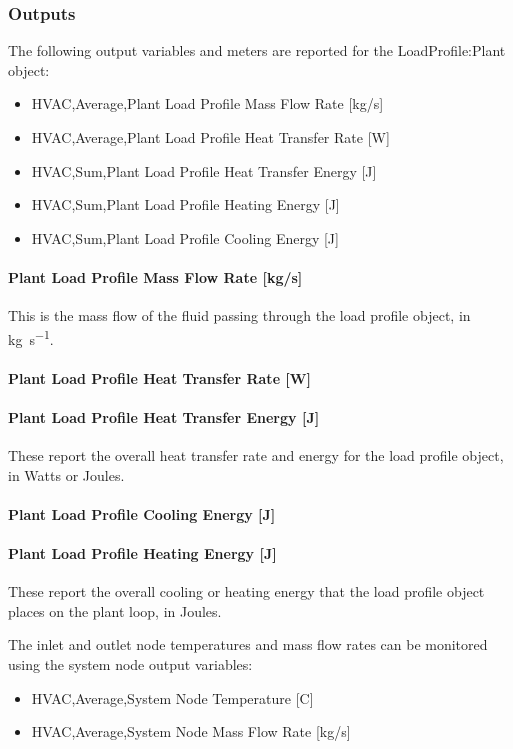 \subsubsection{Outputs}\label{outputs-020}

The following output variables and meters are reported for the LoadProfile:Plant object:

\begin{itemize}
\item HVAC,Average,Plant Load Profile Mass Flow Rate [kg/s]
\item HVAC,Average,Plant Load Profile Heat Transfer Rate [W]
\item HVAC,Sum,Plant Load Profile Heat Transfer Energy [J]
\item HVAC,Sum,Plant Load Profile Heating Energy [J]
\item HVAC,Sum,Plant Load Profile Cooling Energy [J]
\end{itemize}

\paragraph{Plant Load Profile Mass Flow Rate [kg/s]}\label{plant-load-profile-mass-flow-rate-kgs}

This is the mass flow of the fluid passing through the load profile object, in \si{\kg\per\s}.

\paragraph{Plant Load Profile Heat Transfer Rate [W]}\label{plant-load-profile-heat-transfer-rate-w}

\paragraph{Plant Load Profile Heat Transfer Energy [J]}\label{plant-load-profile-heat-transfer-energy-j}

These report the overall heat transfer rate and energy for the load profile object, in Watts or Joules.

\paragraph{Plant Load Profile Cooling Energy [J]}\label{plant-load-profile-cooling-energy-j}

\paragraph{Plant Load Profile Heating Energy [J]}\label{plant-load-profile-heating-energy-j}

These report the overall cooling or heating energy that the load profile object places on the plant loop, in Joules.

The inlet and outlet node temperatures and mass flow rates can be monitored using the system node output variables:

\begin{itemize}
\item HVAC,Average,System Node Temperature [C]
\item HVAC,Average,System Node Mass Flow Rate [kg/s]
\end{itemize}
